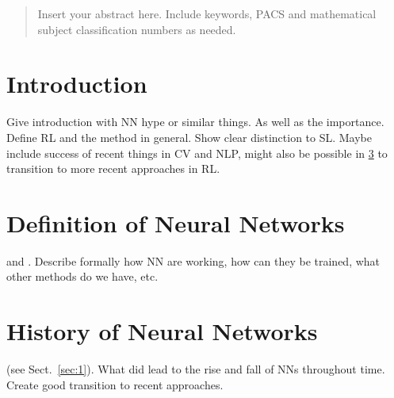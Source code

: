 
    \date{Received: date / Accepted: date}


    \maketitle

    \begin{abstract}
        Insert your abstract here. Include keywords, PACS and mathematical
        subject classification numbers as needed.
    \end{abstract}

    \section{Introduction}
    \label{sec:intro}
    Give introduction with NN hype or similar things. As well as the importance.
    Define RL and the method in general.
    Show clear distinction to SL.
    Maybe include success of recent things in CV and NLP, might also be possible in \ref{sec:history} to transition to more recent approaches in RL. 
    \section{Definition of Neural Networks}
    \label{sec:def}
    \cite{RefB} and \cite{RefJ}.
    Describe formally how NN are working, how can they be trained, what other methods do we have, etc.
    \section{History of Neural Networks}
    \label{sec:history}
    (see Sect.~\ref{sec:1}).
    What did lead to the rise and fall of NNs throughout time.
    Create good transition to recent approaches.


